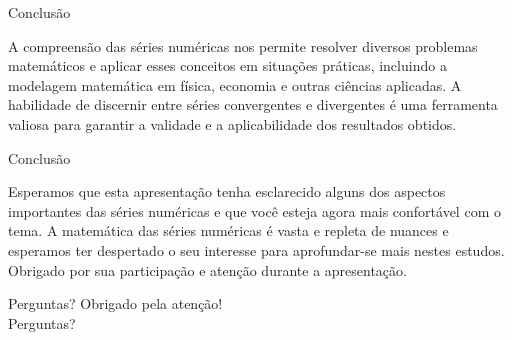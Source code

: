 \documentclass[brazil]{beamer}
\begin{document}
	\begin{frame}{Conclusão}
		\justifying
		
		A compreensão das séries numéricas nos permite resolver diversos problemas
		matemáticos e aplicar esses conceitos em situações práticas, incluindo a
		modelagem matemática em física, economia e outras ciências aplicadas. A
		habilidade de discernir entre séries convergentes e divergentes é uma
		ferramenta valiosa para garantir a validade e a aplicabilidade dos resultados
		obtidos.
		
	\end{frame}
	\begin{frame}{Conclusão}
		
		\justifying
		
		Esperamos que esta apresentação tenha esclarecido alguns dos aspectos
		importantes das séries numéricas e que você esteja agora mais confortável com o
		tema. A matemática das séries numéricas é vasta e repleta de nuances e
		esperamos ter despertado o seu interesse para aprofundar-se mais nestes
		estudos. Obrigado por sua participação e atenção durante a apresentação.
	\end{frame}
	\begin{frame}{Perguntas?}
		\centering
		\Large
		Obrigado pela atenção!\\
		Perguntas?
	\end{frame}
	
\end{document}
